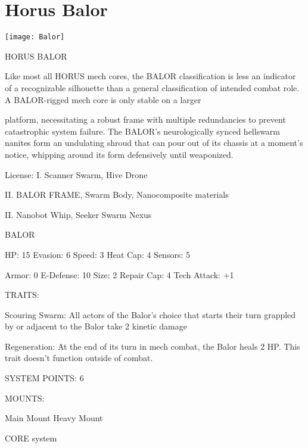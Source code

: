 \section{Horus Balor}

\centering\texttt{[image: Balor]}

                                           HORUS BALOR

Like most all HORUS mech cores, the BALOR classification is less an indicator of a recognizable silhouette
than a general classification of intended combat role. A BALOR-rigged mech core is only stable on a larger

platform, necessitating a robust frame with multiple redundancies to prevent catastrophic system failure.
The BALOR’s neurologically synced hellswarm nanites form an undulating shroud that can pour out of its
chassis at a moment’s notice, whipping around its form defensively until weaponized.

                                                  License:
I. Scanner Swarm, Hive Drone

II. BALOR FRAME, Swarm Body, Nanocomposite materials

II. Nanobot Whip, Seeker Swarm Nexus


                                                 BALOR

 HP: 15         Evasion: 6                           Speed: 3           Heat Cap: 4       Sensors: 5

 Armor: 0       E-Defense: 10                        Size: 2            Repair Cap: 4     Tech Attack:
                                                                                          +1

                                                  TRAITS:

 Scouring Swarm: All actors of the Balor’s choice that starts their turn grappled by or adjacent to the
 Balor take 2 kinetic damage

 Regeneration: At the end of its turn in mech combat, the Balor heals 2 HP. This trait doesn’t function
 outside of combat.

                                            SYSTEM POINTS: 6

                                                 MOUNTS:

 Main Mount                                          Heavy Mount

                                               CORE system





